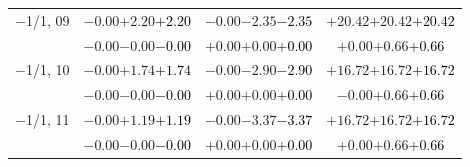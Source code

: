 \documentclass[compress]{beamer}
\begin{document}
\begin{frame}
\begin{tabular}{r | c | c | c}
$-$1/1, 09 & $-0.00$\hspace{0.1 cm}$+2.20$\hspace{0.1 cm}\textcolor{black}{$+2.20$} & $-0.00$\hspace{0.1 cm}$-2.35$\hspace{0.1 cm}\textcolor{black}{$-2.35$} & $+20.42$\hspace{0.1 cm}$+20.42$\hspace{0.1 cm}\textcolor{black}{$+20.42$} \\
           & $-0.00$\hspace{0.1 cm}$-0.00$\hspace{0.1 cm}\textcolor{black}{$-0.00$} & $+0.00$\hspace{0.1 cm}$+0.00$\hspace{0.1 cm}\textcolor{black}{$+0.00$} & $+0.00$\hspace{0.1 cm}$+0.66$\hspace{0.1 cm}\textcolor{black}{$+0.66$} \\
$-$1/1, 10 & $-0.00$\hspace{0.1 cm}$+1.74$\hspace{0.1 cm}\textcolor{black}{$+1.74$} & $-0.00$\hspace{0.1 cm}$-2.90$\hspace{0.1 cm}\textcolor{black}{$-2.90$} & $+16.72$\hspace{0.1 cm}$+16.72$\hspace{0.1 cm}\textcolor{black}{$+16.72$} \\
           & $-0.00$\hspace{0.1 cm}$-0.00$\hspace{0.1 cm}\textcolor{black}{$-0.00$} & $+0.00$\hspace{0.1 cm}$+0.00$\hspace{0.1 cm}\textcolor{black}{$+0.00$} & $-0.00$\hspace{0.1 cm}$+0.66$\hspace{0.1 cm}\textcolor{black}{$+0.66$} \\
$-$1/1, 11 & $-0.00$\hspace{0.1 cm}$+1.19$\hspace{0.1 cm}\textcolor{black}{$+1.19$} & $-0.00$\hspace{0.1 cm}$-3.37$\hspace{0.1 cm}\textcolor{black}{$-3.37$} & $+16.72$\hspace{0.1 cm}$+16.72$\hspace{0.1 cm}\textcolor{black}{$+16.72$} \\
           & $-0.00$\hspace{0.1 cm}$-0.00$\hspace{0.1 cm}\textcolor{black}{$-0.00$} & $+0.00$\hspace{0.1 cm}$+0.00$\hspace{0.1 cm}\textcolor{black}{$+0.00$} & $+0.00$\hspace{0.1 cm}$+0.66$\hspace{0.1 cm}\textcolor{black}{$+0.66$} \\

\end{tabular}
\end{frame}
\end{document}
